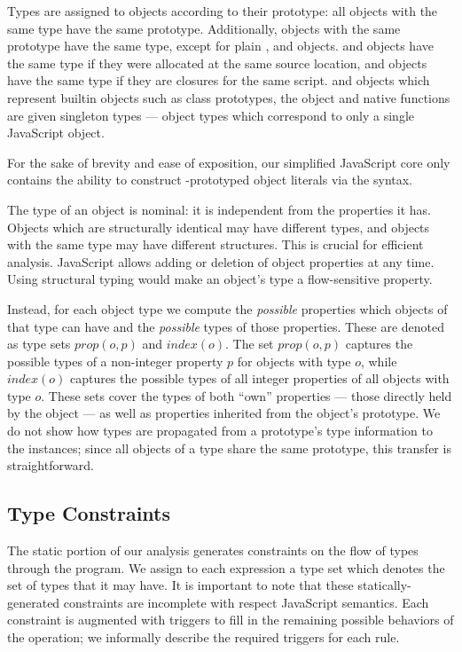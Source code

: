 Types are assigned to objects according to their prototype:
all objects with the same type have the same prototype.
Additionally, objects with the same prototype have the same type,
except for plain ,  and  objects.
 and  objects have the same type if they were
allocated at the same source location,
and  objects have the same type if they are closures
for the same script.
 and  objects which represent builtin objects
such as class prototypes, the  object and native functions
are given singleton types --- object types which correspond to only a single
JavaScript object.

For the sake of brevity and ease of exposition, our simplified JavaScript core
only contains the ability to construct -prototyped object
literals via the \code{\{\}} syntax.

The type of an object is nominal: it is independent from the properties it
has. Objects which are structurally identical may have different types, and
objects with the same type may have different structures. This is crucial for
efficient analysis. JavaScript allows adding or deletion of object properties
at any time. Using structural typing would make an object's type a
flow-sensitive property.

Instead, for each object type we compute the \emph{possible} properties which
objects of that type can have and the \emph{possible} types of those properties.
These are denoted as type sets $\mathit{prop}(o,p)$ and
$\mathit{index}(o)$. The set $\mathit{prop}(o,p)$ captures the possible types
of a non-integer property $p$ for objects with type $o$, while
$\mathit{index}(o)$ captures the possible types of all integer properties of
all objects with type $o$.
These sets cover the types of both ``own'' properties --- those directly held
by the object --- as well as properties inherited from the object's prototype.
We do not show how types are propagated from a prototype's type information
to the instances; since all objects of a type share the same prototype,
this transfer is straightforward.

\subsection{Type Constraints}
\label{sec:constraints}

The static portion of our analysis generates constraints on the flow of types
through the program. We assign to each
expression a type set which denotes the set of types that it may
have. It is important to note that these statically-generated constraints are
incomplete with respect JavaScript semantics. Each constraint is augmented
with triggers to fill in the remaining possible behaviors of the
operation; we informally describe the required triggers for each rule.


